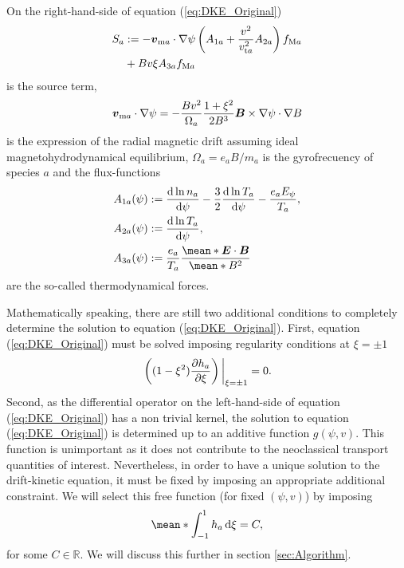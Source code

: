 On the right-hand-side of equation (\ref{eq:DKE_Original}) 
%
\begin{align}
	S_a 
	& :=  
	- \vb*{v}_{\text{m} a} \cdot \nabla \psi 
	\left(
	A_{1a} 
	+  \frac{v^2}{v_{\text{t}a}^2}
	A_{2a}
	\right)
	f_{\text{M}a}
	\nonumber \\ 
	& + 
	B v \xi A_{3a}f_{\text{M}a}
	\label{eq:DKE_Original_Source}
\end{align}
is the source term, 
\begin{align}
	\vb*{v}_{\text{m} a}\cdot\nabla\psi
	=
	-\frac{Bv^2}{\Omega_a}
	\frac{1+\xi^2}{2B^3}
	\vb*{B}\times\nabla\psi \cdot \nabla B 
\end{align}
is the expression of the radial magnetic drift assuming ideal magnetohydrodynamical equilibrium, $\Omega_a = e_a B / m_a$ is the gyrofrecuency of species $a$ and the flux-functions 
%
\begin{align}
	A_{1a}(\psi) & := \dv{\ln n_a}{\psi} - \frac{3}{2} \dv{\ln T_a}{\psi} - \frac{e_a E_\psi}{T_a}, 
	\\
	A_{2a}(\psi) & := \dv{\ln T_a}{\psi} , 
	\\
	A_{3a}(\psi) & :=  \frac{e_a }{T_a} \frac{\mean*{\vb*{E}\cdot\vb*{B}}}{\mean*{B^2}}
\end{align}
are the so-called thermodynamical forces.

Mathematically speaking, there are still two additional conditions to completely determine the solution to equation (\ref{eq:DKE_Original}). First, equation (\ref{eq:DKE_Original}) must be solved imposing regularity conditions at $\xi =\pm 1$
%
\begin{align}
	\eval{\left((1-\xi^2) \pdv{h_a}{\xi}\right)}_{\xi =\pm 1} = 0.
	\label{eq:Regularity_conditions}
\end{align}
Second, as the differential operator on the left-hand-side of equation (\ref{eq:DKE_Original}) has a non trivial kernel, the solution to equation (\ref{eq:DKE_Original}) is determined up to an additive function $g(\psi,v)$. This function is unimportant as it does not contribute to the neoclassical transport quantities of interest. Nevertheless, in order to have a unique solution to the drift-kinetic equation, it must be fixed by imposing an appropriate additional constraint. We will select this free function (for fixed $(\psi,v)$) by imposing
%
\begin{align}
	\mean*{  \int_{-1}^{1} h_a \dd{\xi}  } = C,
	\label{eq:kernel_elimination_condition}
\end{align}
for some $C\in\mathbb{R}$. We will discuss this further in section \ref{sec:Algorithm}. 

